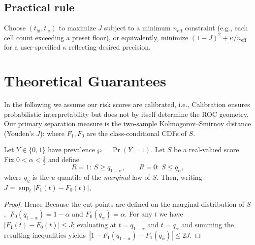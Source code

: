 \documentclass[lineno]{biometrika}
\begin{document}
\subsection{Practical rule}
Choose $(t_{\mathrm{hi}},t_{\mathrm{lo}})$ to maximize $J$ subject to a minimum $n_{\text{eff}}$ constraint
(e.g., each cell count exceeding a preset floor), or equivalently, minimize
$(1-J)^2 + \kappa/n_{\text{eff}}$ for a user-specified $\kappa$ reflecting desired precision.

\section{Theoretical Guarantees}
In the following we assume our risk scores are calibrated,
i.e.,
Calibration ensures probabilistic interpretability but does not by itself determine
the ROC geometry. Our primary separation measure is the two-sample
Kolmogorov–Smirnov distance (Youden’s \(J\)):
where \(F_1,F_0\) are the class-conditional CDFs of \(S\).
%
\begin{lemma}\label{lem:prevalence-gap}
Let \(Y\in\{0,1\}\) have prevalence \(\wp=\Pr(Y=1)\).
Let \(S\) be a real-valued score. Fix \(0<\alpha<\tfrac12\) and define
\[
R=1:\ S\ge q_{1-\alpha},\qquad R=0:\ S\le q_{\alpha},
\]
where \(q_u\) is the \(u\)-quantile of the \emph{marginal} law of \(S\).
Then, writing \(J=\sup_t|F_1(t)-F_0(t)|\),
\end{lemma}
%
\begin{proof}
Hence
%
Because the cut-points are defined on the marginal distribution of \(S\),
\(\;F_0(q_{1-\alpha})=1-\alpha\) and \(F_0(q_{\alpha})=\alpha\).
For any \(t\) we have \(\lvert F_1(t)-F_0(t)\rvert\le J\); evaluating at
\(t=q_{1-\alpha}\) and \(t=q_{\alpha}\) and summing the resulting
inequalities yields
\(\,|1-F_1(q_{1-\alpha})-F_1(q_{\alpha})|\le2J\).
\end{proof}
\end{document}

